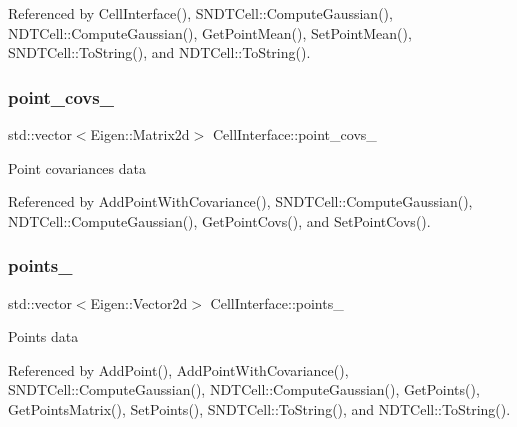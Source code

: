 Referenced by Cell\+Interface(), S\+N\+D\+T\+Cell\+::\+Compute\+Gaussian(), N\+D\+T\+Cell\+::\+Compute\+Gaussian(), Get\+Point\+Mean(), Set\+Point\+Mean(), S\+N\+D\+T\+Cell\+::\+To\+String(), and N\+D\+T\+Cell\+::\+To\+String().

\mbox{\label{classCellInterface_ae60338a437c045b757f7586a8a696409}} 
\subsubsection{\texorpdfstring{point\+\_\+covs\+\_\+}{point\_covs\_}}
{\footnotesize\ttfamily std\+::vector$<$Eigen\+::\+Matrix2d$>$ Cell\+Interface\+::point\+\_\+covs\+\_\+\hspace{0.3cm}{\ttfamily [protected]}}

Point covariances data 

Referenced by Add\+Point\+With\+Covariance(), S\+N\+D\+T\+Cell\+::\+Compute\+Gaussian(), N\+D\+T\+Cell\+::\+Compute\+Gaussian(), Get\+Point\+Covs(), and Set\+Point\+Covs().

\mbox{\label{classCellInterface_a3a869f0534662265a9733df1968c820c}} 
\subsubsection{\texorpdfstring{points\+\_\+}{points\_}}
{\footnotesize\ttfamily std\+::vector$<$Eigen\+::\+Vector2d$>$ Cell\+Interface\+::points\+\_\+\hspace{0.3cm}{\ttfamily [protected]}}

Points data 

Referenced by Add\+Point(), Add\+Point\+With\+Covariance(), S\+N\+D\+T\+Cell\+::\+Compute\+Gaussian(), N\+D\+T\+Cell\+::\+Compute\+Gaussian(), Get\+Points(), Get\+Points\+Matrix(), Set\+Points(), S\+N\+D\+T\+Cell\+::\+To\+String(), and N\+D\+T\+Cell\+::\+To\+String().

\mbox{\label{classCellInterface_a02bccbc4587ef6fd1a31c03a464676c4}} 
